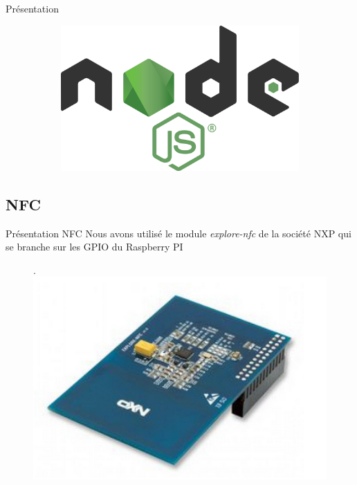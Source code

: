 \documentclass[aspectratio=169]{beamer}
\begin{document}
\begin{frame}{Présentation}
\begin{figure}
\begin{subfigure}{.2\textwidth}
    \end{subfigure}
    \begin{subfigure}{.2\textwidth}
      \centering
      \includegraphics[width=.8\linewidth]{../assets/nodejs.png}
    \end{subfigure}
  \end{figure}
\end{frame}

\subsection{NFC}

\begin{frame}{Présentation NFC}
  Nous avons utilisé le module \textit{explore-nfc} de la société NXP qui se branche sur les GPIO du Raspberry PI
  \begin{figure}.
    \includegraphics[width=.5\textwidth]{../assets/explorenfc.png}
  \end{figure}
\end{frame}
\end{document}
